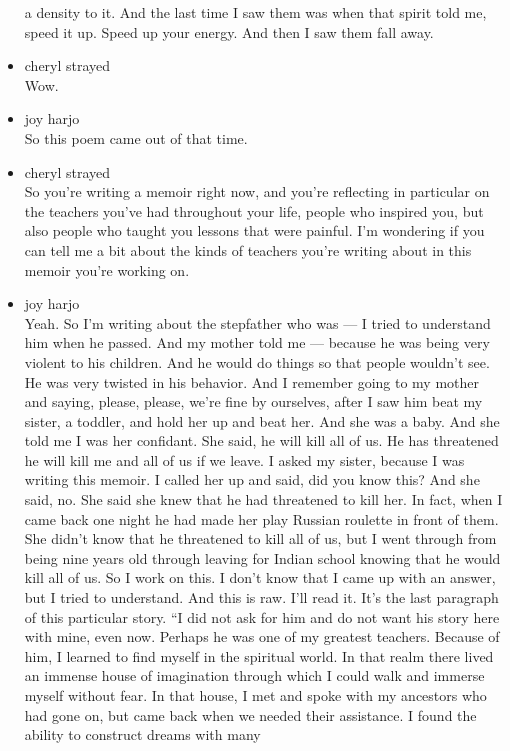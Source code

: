 \begin{itemize}
  a density to it. And the last time I saw them was when that spirit
  told me, speed it up. Speed up your energy. And then I saw them fall
  away.
\item
  cheryl strayed\\
  Wow.
\item
  joy harjo\\
  So this poem came out of that time.
\item
  cheryl strayed\\
  So you're writing a memoir right now, and you're reflecting in
  particular on the teachers you've had throughout your life, people who
  inspired you, but also people who taught you lessons that were
  painful. I'm wondering if you can tell me a bit about the kinds of
  teachers you're writing about in this memoir you're working on.
\item
  joy harjo\\
  Yeah. So I'm writing about the stepfather who was --- I tried to
  understand him when he passed. And my mother told me --- because he
  was being very violent to his children. And he would do things so that
  people wouldn't see. He was very twisted in his behavior. And I
  remember going to my mother and saying, please, please, we're fine by
  ourselves, after I saw him beat my sister, a toddler, and hold her up
  and beat her. And she was a baby. And she told me I was her confidant.
  She said, he will kill all of us. He has threatened he will kill me
  and all of us if we leave. I asked my sister, because I was writing
  this memoir. I called her up and said, did you know this? And she
  said, no. She said she knew that he had threatened to kill her. In
  fact, when I came back one night he had made her play Russian roulette
  in front of them. She didn't know that he threatened to kill all of
  us, but I went through from being nine years old through leaving for
  Indian school knowing that he would kill all of us. So I work on this.
  I don't know that I came up with an answer, but I tried to understand.
  And this is raw. I'll read it. It's the last paragraph of this
  particular story. ``I did not ask for him and do not want his story
  here with mine, even now. Perhaps he was one of my greatest teachers.
  Because of him, I learned to find myself in the spiritual world. In
  that realm there lived an immense house of imagination through which I
  could walk and immerse myself without fear. In that house, I met and
  spoke with my ancestors who had gone on, but came back when we needed
  their assistance. I found the ability to construct dreams with many

\end{itemize}
